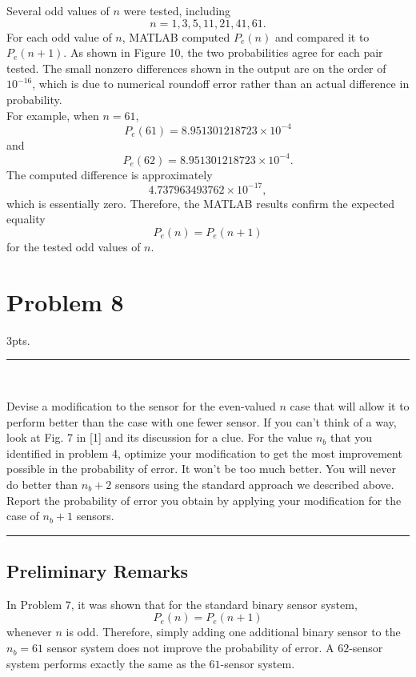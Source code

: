 \documentclass[12pt,a4paper]{article}
\begin{document}
Several odd values of \(n\) were tested, including
\[
n=1,3,5,11,21,41,61.
\]
For each odd value of \(n\), MATLAB computed \(P_e(n)\) and compared it to \(P_e(n+1)\). As shown in Figure 10, the two probabilities agree for each pair tested. The small nonzero differences shown in the output are on the order of \(10^{-16}\), which is due to numerical roundoff error rather than an actual difference in probability.\\

For example, when \(n=61\),
\[
P_e(61)=8.951301218723\times 10^{-4}
\]
and
\[
P_e(62)=8.951301218723\times 10^{-4}.
\]
The computed difference is approximately
\[
4.737963493762\times 10^{-17},
\]
which is essentially zero. Therefore, the MATLAB results confirm the expected equality
\[
\boxed{P_e(n)=P_e(n+1)}
\]
for the tested odd values of \(n\).

\clearpage

\section{Problem 8}
3pts.\\

\hrule 

\

\noindent Devise a modification to the sensor for the even-valued $n$ case that will allow it to perform better than the case with one fewer sensor. If you can't think of a way, look at Fig. 7 in [1] and its discussion for a clue. For the value $n_b$ that you identified in problem 4, optimize your modification to get the most improvement possible in the probability of error. It won't be too much better. You will never do better than $n_b + 2$ sensors using the standard approach we described above. Report the probability of error you obtain by applying your modification for the case of $n_b + 1$ sensors.
\\

\hrule

\subsection{Preliminary Remarks}
In Problem 7, it was shown that for the standard binary sensor system,
\[
P_e(n)=P_e(n+1)
\]
whenever \(n\) is odd. Therefore, simply adding one additional binary sensor to the \(n_b=61\) sensor system does not improve the probability of error. A \(62\)-sensor system performs exactly the same as the \(61\)-sensor system.\\
\end{document}
